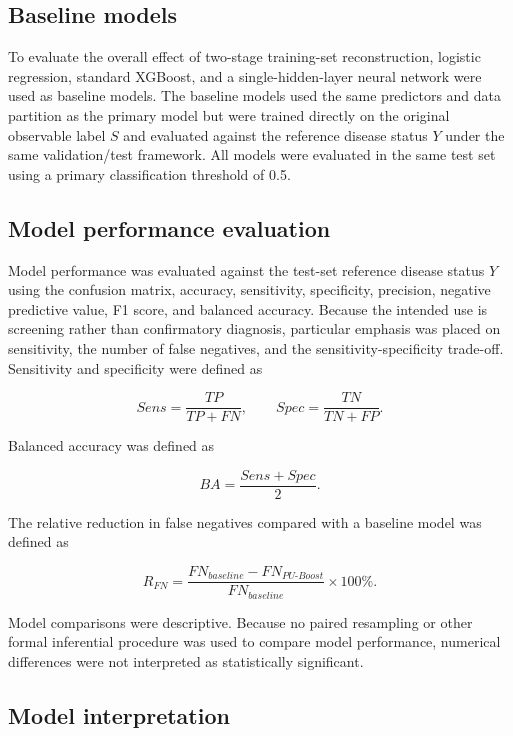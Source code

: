 \documentclass[10pt]{article}
\begin{document}
\subsection{Baseline models}\label{baseline-models}

To evaluate the overall effect of two-stage training-set reconstruction,
logistic regression, standard XGBoost, and a single-hidden-layer neural
network were used as baseline models. The baseline models used the same
predictors and data partition as the primary model but were trained
directly on the original observable label \(S\) and evaluated against
the reference disease status \(Y\) under the same validation/test
framework. All models were evaluated in the same test set using a
primary classification threshold of 0.5.

\subsection{Model performance
evaluation}\label{model-performance-evaluation}

Model performance was evaluated against the test-set reference disease
status \(Y\) using the confusion matrix, accuracy, sensitivity,
specificity, precision, negative predictive value, F1 score, and
balanced accuracy. Because the intended use is screening rather than
confirmatory diagnosis, particular emphasis was placed on sensitivity,
the number of false negatives, and the sensitivity-specificity
trade-off. Sensitivity and specificity were defined as

\[Sens = \frac{TP}{TP + FN},\quad\quad Spec = \frac{TN}{TN + FP}.\]

Balanced accuracy was defined as

\[BA = \frac{Sens + Spec}{2}.\]

The relative reduction in false negatives compared with a baseline model
was defined as

\[R_{FN} = \frac{FN_{baseline} - FN_{PU\text{-}Boost}}{FN_{baseline}} \times 100\%.\]

Model comparisons were descriptive. Because no paired resampling or
other formal inferential procedure was used to compare model
performance, numerical differences were not interpreted as statistically
significant.

\subsection{Model interpretation}\label{model-interpretation}
\end{document}
